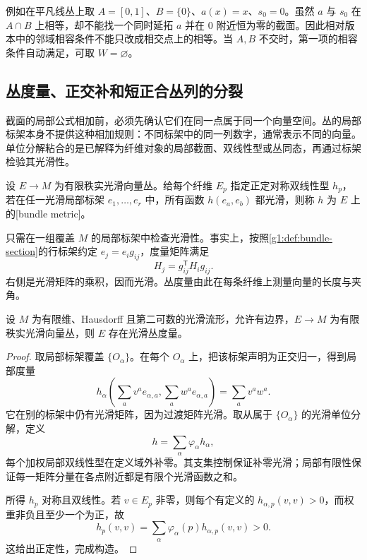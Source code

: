 例如在平凡线丛上取 \(A=[0,1]\)、\(B=\{0\}\)、\(a(x)=x\)、\(s_0=0\)。虽然 \(a\) 与 \(s_0\) 在 \(A\cap B\) 上相等，却不能找一个同时延拓 \(a\) 并在 \(0\) 附近恒为零的截面。因此相对版本中的邻域相容条件不能只改成相交点上的相等。当 \(A,B\) 不交时，第一项的相容条件自动满足，可取 \(W=\varnothing\)。

\subsection{丛度量、正交补和短正合丛列的分裂}
\label{g1:subsec:1203:04}

截面的局部公式相加前，必须先确认它们在同一点属于同一个向量空间。丛的局部标架本身不提供这种相加规则：不同标架中的同一列数字，通常表示不同的向量。单位分解粘合的是已解释为纤维对象的局部截面、双线性型或丛同态，再通过标架检验其光滑性。

\begin{definition}\label{g1:def:bundle-metric}
	设 \(E\to M\) 为有限秩实光滑向量丛。给每个纤维 \(E_p\) 指定正定对称双线性型 \(h_p\)，若在任一光滑局部标架 \(e_1,\ldots,e_r\) 中，所有函数 \(h(e_a,e_b)\) 都光滑，则称 \(h\) 为 \(E\) 上的[bundle metric]。
\end{definition}

只需在一组覆盖 \(M\) 的局部标架中检查光滑性。事实上，按照\cref{g1:def:bundle-section}的行标架约定 \(e_j=e_i g_{ij}\)，度量矩阵满足
\[
	H_j=g_{ij}^{\mathsf T}H_i g_{ij}.
\]
右侧是光滑矩阵的乘积，因而光滑。丛度量由此在每条纤维上测量向量的长度与夹角。

\begin{theorem}\label{g1:thm:bundle-metric-existence}
	设 \(M\) 为有限维、Hausdorff 且第二可数的光滑流形，允许有边界，\(E\to M\) 为有限秩实光滑向量丛，则 \(E\) 存在光滑丛度量。
\end{theorem}
\begin{proof}
	取局部标架覆盖 \(\{O_\alpha\}\)。在每个 \(O_\alpha\) 上，把该标架声明为正交归一，得到局部度量
	\[
		h_\alpha\!\left(\sum_a v^a e_{\alpha,a},\sum_a w^a e_{\alpha,a}\right)
		=\sum_a v^a w^a.
	\]
	它在别的标架中仍有光滑矩阵，因为过渡矩阵光滑。取从属于 \(\{O_\alpha\}\) 的光滑单位分解，定义
	\[
		h=\sum_\alpha\varphi_\alpha h_\alpha,
	\]
	每个加权局部双线性型在定义域外补零。其支集控制保证补零光滑；局部有限性保证每一矩阵分量在各点附近都是有限个光滑函数之和。

	所得 \(h_p\) 对称且双线性。若 \(v\in E_p\) 非零，则每个有定义的 \(h_{\alpha,p}(v,v)>0\)，而权重非负且至少一个为正，故
	\[
		h_p(v,v)=\sum_\alpha\varphi_\alpha(p)h_{\alpha,p}(v,v)>0.
	\]
	这给出正定性，完成构造。
\end{proof}

